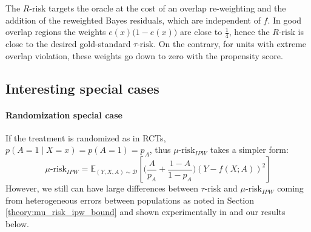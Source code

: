 \documentclass[french,12pt,twoside,a4paper]{book}
\begin{document}
The $R \text{-risk}$ targets the oracle at the cost of an overlap re-weighting
and the addition of the reweighted Bayes residuals, which are independent of
$f$. In good overlap regions the weights $e(x) \big(1-e(x) \big)$ are close to
$\frac{1}{4}$, hence the $R \text{-risk}$ is close to the desired gold-standard
$\tau \text{-risk}$. On the contrary, for units with extreme overlap violation,
these weights go down to zero with the propensity score.




\subsection{Interesting special cases}

\paragraph{Randomization special case}\label{remark:rct} If the treatment is
randomized as in RCTs, $p(A=1 \mid X=x) = p(A=1)=p_A$, thus
$\mu\text{-risk}_{IPW}$ takes a simpler form:
\begin{equation*}
  \mu\text{-risk}_{IPW} = \mathbb{E}_{(Y, X, A) \sim \mathcal D}\left[ \Big( \frac{A}{p_A} + \frac{1-A}{1-p_A} \Big) (Y-f(X ; A))^2 \right]
\end{equation*}
However, we still can have large differences
between $\tau\text{-risk}$ and $\mu\text{-risk}_{IPW}$ coming from heterogeneous
errors between populations as noted in Section \ref{theory:mu_risk_ipw_bound}
and shown experimentally in \citet{schuler_comparison_2018} and our
results below.
\end{document}
